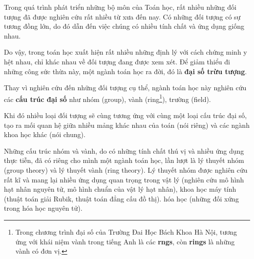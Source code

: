 Trong quá trình phát triển những bộ môn của Toán học, rất nhiều những đối tượng đã được nghiên cứu rất nhiều từ xưa đến nay. Có những đối tượng có sự tương đồng lớn, do đó dẫn đến việc chúng có nhiều tính chất và ứng dụng giống nhau. 

Do vậy, trong toán học xuất hiện rất nhiều những định lý với cách chứng minh y hệt nhau, chỉ khác nhau về đối tượng đang được xem xét. Để giảm thiểu đi những công sức thừa này, một ngành toán học ra đời, đó là \textbf{đại số trừu tượng}.

Thay vì nghiên cứu đến những đối tượng cụ thể, ngành toán học này nghiên cứu các \textbf{cấu trúc đại số} như nhóm (group), vành (ring\footnote{Trong chương trình đại số của Trường Đai Học Bách Khoa Hà Nội, tương ứng với khái niệm vành trong tiếng Anh là các \textbf{rngs}, còn \textbf{rings} là những vành có đơn vị.}), trường (field).

Khi đó nhiều loại đối tượng sẽ cùng tương ứng với cùng một loại cấu trúc đại số, tạo ra mối quan hệ giữa nhiều mảng khác nhau của toán (nói riêng) và các ngành khoa học khác (nói chung).

Những cấu trúc nhóm và vành, do có những tính chất thú vị và nhiều ứng dụng thực tiễn, đã có riêng cho mình một ngành toán học, lần lượt là lý thuyết nhóm (group theory) và lý thuyết vành (ring theory). Lý thuyết nhóm được nghiên cứu rất kĩ và mang lại nhiều ứng dụng quan trọng trong vật lý (nghiên cứu mô hình hạt nhân nguyên tử, mô hình chuẩn của vật lý hạt nhân), khoa học máy tính (thuật toán giải Rubik, thuật toán đẳng cấu đồ thị). hóa học (những đối xứng trong hóa học nguyên tử).


